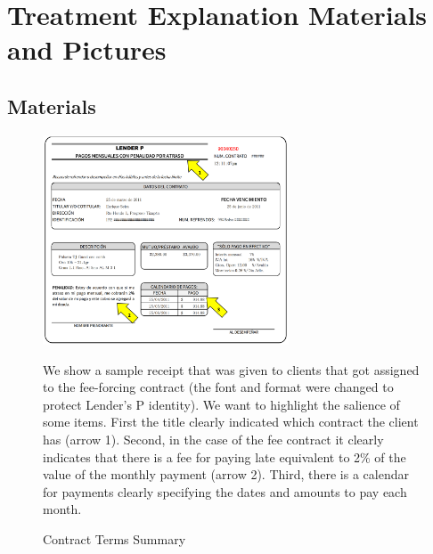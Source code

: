 \begingroup
\let\clearpage\relax
\tableofcontents
\endgroup


\newpage



\section{Treatment Explanation Materials and Pictures}
\vspace{.2in}

\subsection{Materials}

\begin{figure}[H]
     \caption{Contract Terms Summary}
    \label{PaperSlip}
    \begin{center}
        \includegraphics[width=0.65\textwidth]{Figuras/TicketLenderP.png}
    
    \end{center}
    \scriptsize
        We show a sample receipt that was given to clients that got assigned to the fee-forcing contract (the font and format were changed to protect Lender's P identity). We want to highlight the salience of some items. First the title clearly indicated which contract the client has (arrow 1). Second, in the case of the fee contract it clearly indicates that there is a fee for paying late equivalent to 2\% of the value of the monthly payment (arrow 2). Third, there is a calendar for payments clearly specifying the dates and amounts to pay each month. %
\end{figure}



